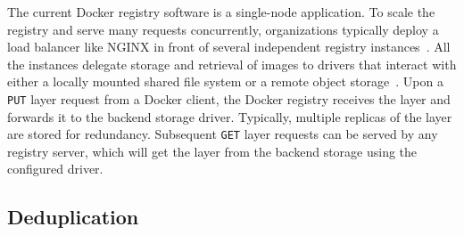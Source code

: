 The current Docker registry software is a single-node application.
%
To scale the registry and serve many requests concurrently, organizations typically deploy a load
balancer like NGINX in front of several independent registry
instances~\cite{dockerworkload, littley2019bolt}.
%
All the instances delegate storage and retrieval of images to drivers that interact with
either a locally mounted shared file system or a remote object storage~\cite{s3,azure,swift,aliyun}.
%
%
Upon a \texttt{PUT} layer request from a Docker client, the Docker registry receives the layer and forwards it to the
backend storage driver.
%
Typically, multiple replicas of the layer are stored for redundancy.
%
Subsequent \texttt{GET} layer requests can be served by any registry server,
which will get the layer from the backend storage using the configured driver.

%

\subsection{Deduplication}

%
%
%
%
%
%
%

